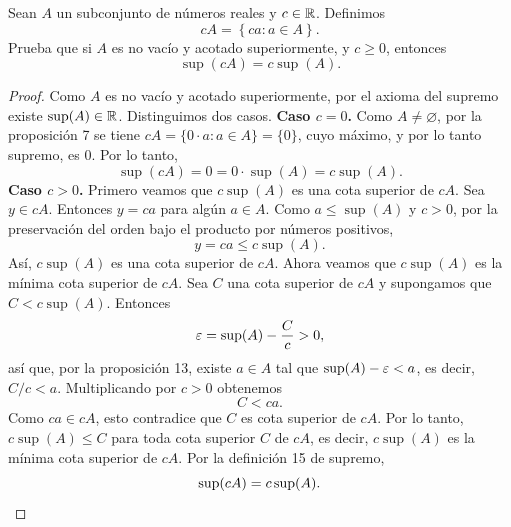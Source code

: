 \documentclass[12pt,a4paper]{article}
\begin{document}
    \begin{problema}
        Sean $A$ un subconjunto de números reales y $c\in\mathbb{R}$. Definimos
        \begin{equation*}
            cA=\left\{ ca:a\in A\right\} .
        \end{equation*}
        Prueba que si $A$ es no vacío y acotado superiormente, y $c\geq0$, entonces
        \begin{equation*}
            \sup\left(cA\right)=c\sup\left(A\right).
        \end{equation*}
    \end{problema}

    \begin{proof}
        Como $A$ es no vacío y acotado superiormente, por el axioma del supremo existe $\sup(A)\in\mathbb{R}$. Distinguimos dos casos.
        \textbf{Caso $c=0$.} Como $A\neq\varnothing$, por la proposición 7 se tiene $cA=\{0\cdot a:a\in A\}=\{0\}$, cuyo máximo, y por lo tanto supremo, es $0$. Por lo tanto,
        \begin{equation*}
            \sup(cA)=0=0\cdot\sup(A)=c\sup(A).
        \end{equation*}
        \textbf{Caso $c>0$.} Primero veamos que $c\sup(A)$ es una cota superior de $cA$. Sea $y\in cA$. Entonces $y=ca$ para algún $a\in A$. Como $a\leq\sup(A)$ y $c>0$, por la preservación del orden bajo el producto por números positivos,
        \begin{equation*}
            y=ca\leq c\sup(A).
        \end{equation*}
        Así, $c\sup(A)$ es una cota superior de $cA$.
        Ahora veamos que $c\sup(A)$ es la mínima cota superior de $cA$. Sea $C$ una cota superior de $cA$ y supongamos que $C<c\sup(A)$. Entonces
        \begin{equation*}
            \varepsilon=\sup(A)-\frac{C}{c}>0,
        \end{equation*}
        así que, por la proposición 13, existe $a\in A$ tal que $\sup(A)-\varepsilon<a$, es decir, $C/c<a$. Multiplicando por $c>0$ obtenemos
        \begin{equation*}
            C<ca.
        \end{equation*}
        Como $ca\in cA$, esto contradice que $C$ es cota superior de $cA$. Por lo tanto, $c\sup(A)\leq C$ para toda cota superior $C$ de $cA$, es decir, $c\sup(A)$ es la mínima cota superior de $cA$. Por la definición 15 de supremo,
        \begin{equation*}
            \sup(cA)=c\sup(A).\qedhere
        \end{equation*}
    \end{proof}
\end{document}
